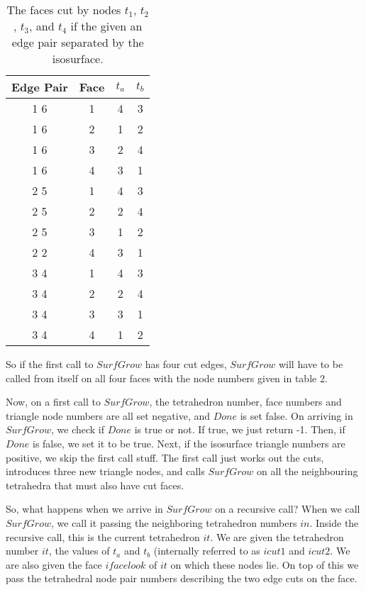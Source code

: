 \documentclass[12pt]{article}
\begin{document}
\begin{table}
\begin{center}
 \begin{tabular}{|c|c|c|c|}\hline
Edge Pair&    Face   &  $t_a$ &  $t_b$   \\ \hline
1  6 &        1  &   4   &  3    \\ \hline
1  6 &        2  &   1   &  2    \\ \hline
1  6 &        3  &   2   &  4    \\ \hline
1  6 &        4  &   3   &  1    \\ \hline
2  5 &        1  &   4   &  3    \\ \hline
2  5 &        2  &   2   &  4    \\ \hline
2  5 &        3  &   1   &  2    \\ \hline
2  2 &        4  &   3   &  1    \\ \hline
3  4 &        1  &   4   &  3    \\ \hline
3  4 &        2  &   2   &  4    \\ \hline
3  4 &        3  &   3   &  1    \\ \hline
3  4 &        4  &   1   &  2    \\ \hline
\end{tabular}
\end{center}
\caption{The faces cut by nodes $t_1$, $t_2$, $t_3$, and $t_4$ if the
given an edge pair separated by the isosurface.}
\end{table}

So if the first call to $SurfGrow$ has four cut edges, $SurfGrow$
will have to be  called from itself on all four faces with the 
node numbers given in table 2.


Now, on a first call to $SurfGrow$, the tetrahedron number, face numbers
and triangle node numbers are all set negative, and $Done$ is set false.
On arriving in $SurfGrow$, we check if $Done$ is true or not.
If true, we just return -1. Then, if $Done$ is false,
 we set it to be true. Next, if the isosurface  triangle
numbers are
positive, we skip the first call stuff.
The first call just works out the cuts, introduces three new triangle
nodes, and calls $SurfGrow$ on all the neighbouring tetrahedra that must also have 
cut faces.

So, what happens when we arrive in $SurfGrow$ on a recursive call?
When we call $SurfGrow$, we call it passing the neighboring tetrahedron
numbers $in$. Inside the recursive call, this is the current tetrahedron $it$.
We are given the tetrahedron number $it$, the values of $t_a$ and
$t_b$ (internally referred to as $icut1$ and $icut2$. We are also
given the face  $ifacelook$ of $it$ on which these nodes lie. On top of this
we pass the tetrahedral node pair numbers describing the two edge cuts on the face.
\end{document}

